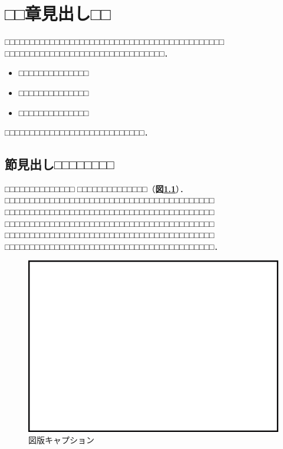 ﻿
\chapter{□□章見出し□□}


□□□□□□□□□□□□□□□□□□□□□□□□□□□□□□□□□□□□□□□□□□□□
□□□□□□□□□□□□□□□□□□□□□□□□□□□□□□□□．

\vspace{0.5\Cvs}
\begin{itemize}
\setlength{\leftskip}{1zw}
 \item □□□□□□□□□□□□□□
 \item □□□□□□□□□□□□□□
 \item □□□□□□□□□□□□□□
\end{itemize}
\vspace{0.5\Cvs}
□□□□□□□□□□□□□□□□□□□□□□□□□□□□．



\section{節見出し□□□□□□□□}
%

□□□□□□□□□□□□□□
□□□□□□□□□□□□□□（{\bf 図\ref{fg:opticalflowimage}}）．□□□□□□□□□□□□□□□□□□□□□□□□□□□□□□□□□□□□□□□□□□
□□□□□□□□□□□□□□□□□□□□□□□□□□□□□□□□□□□□□□□□□□
□□□□□□□□□□□□□□□□□□□□□□□□□□□□□□□□□□□□□□□□□□
□□□□□□□□□□□□□□□□□□□□□□□□□□□□□□□□□□□□□□□□□□
□□□□□□□□□□□□□□□□□□□□□□□□□□□□□□□□□□□□□□□□□□．
%
\begin{figure}[b]
\begin{center}
\includegraphics[scale=1.0]{fig/fig0-1.eps}
 \caption{図版キャプション}
 \label{fg:opticalflowimage}
\end{center}
\end{figure}
%

